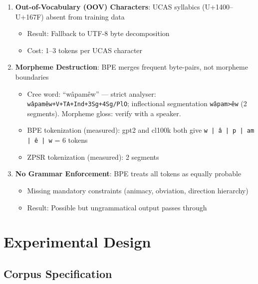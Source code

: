 \documentclass[11pt,oneside]{article}
\begin{document}
\begin{enumerate}
  \item \textbf{Out-of-Vocabulary (OOV) Characters}: UCAS syllabics (U+1400--U+167F) absent from training data
  \begin{itemize}
    \item Result: Fallback to UTF-8 byte decomposition
    \item Cost: 1--3 tokens per UCAS character
  \end{itemize}

  \item \textbf{Morpheme Destruction}: BPE merges frequent byte-pairs, not morpheme boundaries
  \begin{itemize}
    \item Cree word: ``wâpamêw'' --- strict analyser: \texttt{wâpamêw+V+TA+Ind+3Sg+4Sg/PlO}; inflectional segmentation \texttt{wâpam>êw} (2 segments). Morpheme gloss: verify with a speaker.
    \item BPE tokenization (measured): gpt2 and cl100k both give \texttt{w | â | p | am | ê | w} = 6 tokens
    \item ZPSR tokenization (measured): 2 segments
  \end{itemize}

  \item \textbf{No Grammar Enforcement}: BPE treats all tokens as equally probable
  \begin{itemize}
    \item Missing mandatory constraints (animacy, obviation, direction hierarchy)
    \item Result: Possible but ungrammatical output passes through
  \end{itemize}
\end{enumerate}

\section{Experimental Design}

\subsection{Corpus Specification}
\end{document}
